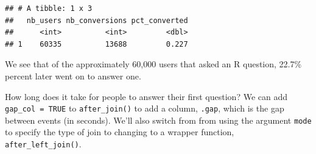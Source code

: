\documentclass[]{article}
\newenvironment{Shaded}{\begin{snugshade}}{\end{snugshade}}
\newcommand{\KeywordTok}[1]{\textcolor[rgb]{0.13,0.29,0.53}{\textbf{#1}}}
\newcommand{\DataTypeTok}[1]{\textcolor[rgb]{0.13,0.29,0.53}{#1}}
\newcommand{\DecValTok}[1]{\textcolor[rgb]{0.00,0.00,0.81}{#1}}
\newcommand{\StringTok}[1]{\textcolor[rgb]{0.31,0.60,0.02}{#1}}
\newcommand{\OtherTok}[1]{\textcolor[rgb]{0.56,0.35,0.01}{#1}}
\newcommand{\OperatorTok}[1]{\textcolor[rgb]{0.81,0.36,0.00}{\textbf{#1}}}
\newcommand{\NormalTok}[1]{#1}
\begin{document}
\begin{verbatim}
## # A tibble: 1 x 3
##   nb_users nb_conversions pct_converted
##      <int>          <int>         <dbl>
## 1    60335          13688         0.227
\end{verbatim}

We see that of the approximately 60,000 users that asked an R question,
22.7\% percent later went on to answer one.

How long does it take for people to answer their first question? We can
add \texttt{gap\_col\ =\ TRUE} to \texttt{after\_join()} to add a
column, \texttt{.gap}, which is the gap between events (in seconds).
We'll also switch from from using the argument \texttt{mode} to specify
the type of join to changing to a wrapper function,
\texttt{after\_left\_join()}.

\begin{Shaded}
\end{Shaded}
\end{document}
